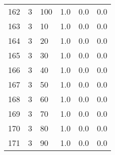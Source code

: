 \documentclass{article}
\begin{document}
{\begin{tabular}{llllll}
162 &         3 &        100 &              1.0 &                       0.0 &                                   0.0 \\
163 &         3 &         10 &              1.0 &                       0.0 &                                   0.0 \\
164 &         3 &         20 &              1.0 &                       0.0 &                                   0.0 \\
165 &         3 &         30 &              1.0 &                       0.0 &                                   0.0 \\
166 &         3 &         40 &              1.0 &                       0.0 &                                   0.0 \\
167 &         3 &         50 &              1.0 &                       0.0 &                                   0.0 \\
168 &         3 &         60 &              1.0 &                       0.0 &                                   0.0 \\
169 &         3 &         70 &              1.0 &                       0.0 &                                   0.0 \\
170 &         3 &         80 &              1.0 &                       0.0 &                                   0.0 \\
171 &         3 &         90 &              1.0 &                       0.0 &                                   0.0 \\
\bottomrule
\end{tabular}
}
\newpage
\end{document}
